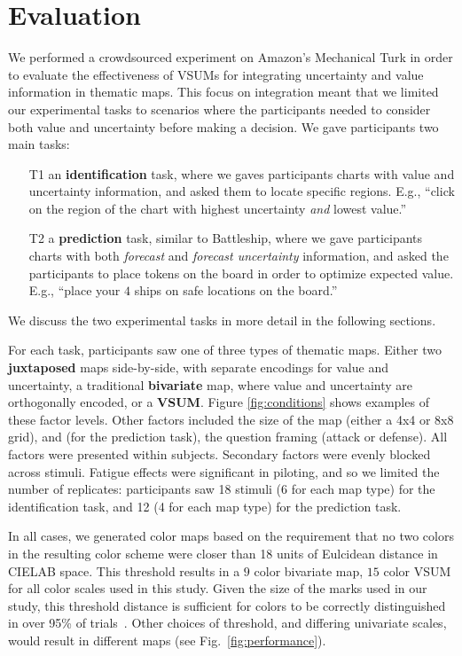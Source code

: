 \documentclass{vgtc}                          %
\begin{document}
\section{Evaluation}

\conditionFig

We performed a crowdsourced experiment on Amazon's Mechanical Turk in order to evaluate the effectiveness of VSUMs for integrating uncertainty and value information in thematic maps. This focus on integration meant that we limited our experimental tasks to scenarios where the participants needed to consider both value and uncertainty before making a decision. We gave participants two main tasks:

\begin{enumerate}
	\item [T1] an \textbf{identification} task, where we gaves participants charts with value and uncertainty information, and asked them to locate specific regions. E.g., ``click on the region of the chart with highest uncertainty \emph{and} lowest value.''
	\item [T2] a \textbf{prediction} task, similar to Battleship, where we gave participants charts with both \emph{forecast} and \emph{forecast uncertainty} information, and asked the participants to place tokens on the board in order to optimize expected value. E.g., ``place your $4$ ships on safe locations on the board.''
\end{enumerate}

We discuss the two experimental tasks in more detail in the following sections.

For each task, participants saw one of three types of thematic maps. Either two \textbf{juxtaposed} maps side-by-side, with separate encodings for value and uncertainty, a traditional \textbf{bivariate} map, where value and uncertainty are orthogonally encoded, or a \textbf{VSUM}. Figure \ref{fig:conditions} shows examples of these factor levels. Other factors included the size of the map (either a 4x4 or 8x8 grid), and (for the prediction task), the question framing (attack or defense). All factors were presented within subjects. Secondary factors were evenly blocked across stimuli. Fatigue effects were significant in piloting, and so we limited the number of replicates: participants saw 18 stimuli (6 for each map type) for the identification task, and 12 (4 for each map type) for the prediction task. 

In all cases, we generated color maps based on the requirement that no two colors in the resulting color scheme were closer than 18 units of Eulcidean distance in CIELAB space. This threshold results in a $9$ color bivariate map, $15$ color VSUM for all color scales used in this study. Given the size of the marks used in our study, this threshold distance is sufficient for colors to be correctly distinguished in over 95\% of trials~\cite{stone2014engineering}. Other choices of threshold, and differing univariate scales, would result in different maps (see Fig.~\ref{fig:performance}). 
\end{document}
